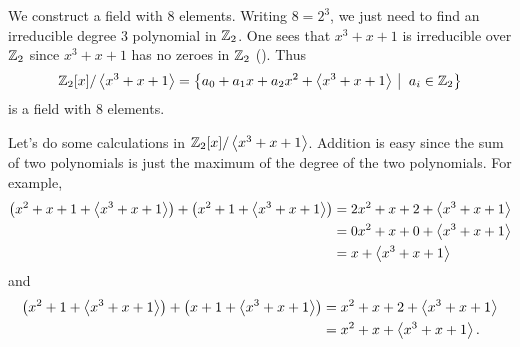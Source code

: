 \begin{example}
    We construct a field with 8 elements. Writing $8 = 2^3$, we just need to find an irreducible degree 3 polynomial in $\mathbb{Z}_2$. One sees that $x^3 + x + 1$ is irreducible over $\mathbb{Z}_2$ since $x^3 + x + 1$ has no zeroes in $\mathbb{Z}_2$ (). Thus
    \[
        \Z_2[x]/\princ{x^3+x+1} = \left\{a_0 + a_1x + a_2x^2 + \princ{x^3+x+1} \vert a_i \in \Z_2\right\}
    \]
    is a field with 8 elements.

    Let's do some calculations in $\mathbb{Z}_2[x]/\left\langle x^3+x+1\right\rangle$. Addition is easy since the sum of two polynomials is just the maximum of the degree of the two polynomials. For example,
    \begin{align*}
        \left(x^2 + x + 1 + \left\langle x^3 + x + 1\right\rangle\right) + \left(x^2 + 1 + \left\langle x^3 + x + 1\right\rangle\right) &= 2x^2 + x + 2 + \left\langle x^3 + x + 1\right\rangle\\
        &= 0x^2 + x + 0 + \left\langle x^3 + x + 1\right\rangle\\
        &= x + \left\langle x^3 + x + 1\right\rangle
    \end{align*}
    and
    \begin{align*}
        \left(x^2 + 1 + \left\langle x^3 + x + 1\right\rangle\right) + \left(x + 1 + \left\langle x^3 + x + 1\right\rangle\right) &= x^2 + x + 2 + \left\langle x^3 + x + 1\right\rangle\\
        &= x^2 + x + \left\langle x^3 + x + 1\right\rangle.
    \end{align*}


\end{example}
